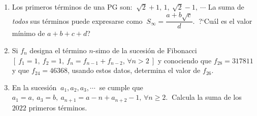 \begin{enumerate}
\vspace{-10mm} %
\begin{flushright}
\begin{footnotesize} \textcolor{gris}{}	\end{footnotesize}
\end{flushright}


%
\item	Los primeros términos de una PG son: $ \ \sqrt{2}+1,\, 1,\ \sqrt{2}-1,\ \cdots $
La suma de \emph{todos} sus términos puede expresarse como $\ S_\infty=\dfrac{a+b\sqrt{c}}{d}.\ $ ?`Cuál es el valor mínimo de $a+b+c+d$? 

\vspace{-6mm}
\begin{flushright}
\begin{footnotesize} \textcolor{gris}{}	\end{footnotesize}
\end{flushright}


%
\item	Si $f_n$ designa el término $n$-simo de la sucesión de Fibonacci \textcolor{gris}{$[ \ f_1=1,\ f_2=1,\ f_n=f_{n-1}+f_{n-2},\, \forall n>2 \ ]$} y conociendo que $f_{28}=317811$ y que $f_{24}=46368$, usando estos datos, determina el valor de $f_{26}$.

\vspace{-6mm}
\begin{flushright}
\begin{footnotesize} \textcolor{gris}{}	\end{footnotesize}
\end{flushright}


%
\item	En la sucesión $ \ a_1,a_2,a_3,\cdots \ $ se cumple que $a_1=a,\  a_3=b,\ a_{n+1}=a-n+a_{n+2}-1,\, \forall n\geq 2. \ $ Calcula la suma de los $2022$ primeros términos.

\vspace{-4mm}
\begin{flushright}
\begin{footnotesize} \textcolor{gris}{}	\end{footnotesize}


\end{flushright}
\end{enumerate}
